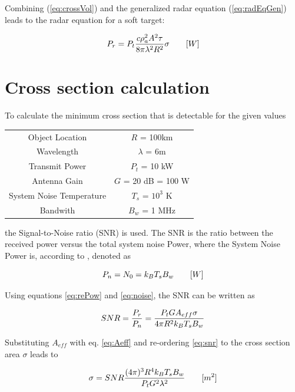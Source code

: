 Combining (\ref{eq:crossVol}) and the generalized radar equation (\ref{eq:radEqGen}) leads to the radar equation for a soft target:

\begin{equation}
\label{eq:radEqSoft}
	\centering
	P_{r} = P_t \frac{c \rho_a^2 A^2 \tau}{8 \pi \lambda^2 R^2} \sigma \qquad [W]
\end{equation}


\section{Cross section calculation}
To calculate the minimum cross section that is detectable for the given values

\begin{center}
\begin{tabular}{c c}
	Object Location & $R$ = 100km \\
	Wavelength & $\lambda$ = 6m \\
	Transmit Power & $P_t$ = 10 kW \\
	Antenna Gain & $G$ = 20 dB = 100 W\\
	System Noise Temperature & $T_s$ = $10^3$ K \\
	Bandwith & $B_w$ = 1 MHz
\end{tabular}
\end{center}

the Signal-to-Noise ratio (SNR) is used. The SNR is the ratio between the received power versus the total system noise Power, where the System Noise Power is, according to , denoted as

\begin{equation}
\label{eq:noise}
	\centering
	P_n = N_0 = k_B T_s B_w \qquad [W]
\end{equation}

Using equations \ref{eq:rePow} and \ref{eq:noise}, the SNR can be written as

\begin{equation}
\label{eq:snr}
	\centering
	SNR = \frac{P_r}{P_n} = \frac{P_t G A_{eff} \sigma}{4 \pi R^2 k_B T_s B_w}
\end{equation}

Substituting $A_{eff}$ with eq. \ref{eq:Aeff} and re-ordering \ref{eq:snr} to the cross section area $\sigma$ leads to

\begin{equation}
\label{eq:snr}
	\centering
	\sigma = {SNR} \frac{(4 \pi)^3 R^4 k_B T_s B_w}{P_t G^2 \lambda^2}	\qquad [m^2]
\end{equation}

